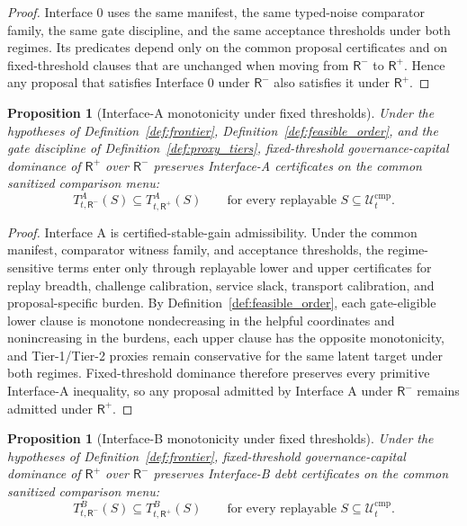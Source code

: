 \documentclass[11pt]{article}
\newtheorem{proposition}[theorem]{Proposition}
\theoremstyle{definition}
\newcommand{\1}{\mathbf{1}}
\begin{document}
\begin{proof}
Interface 0 uses the same manifest, the same typed-noise comparator family, the same gate discipline, and the same acceptance thresholds under both regimes. Its predicates depend only on the common proposal certificates and on fixed-threshold clauses that are unchanged when moving from $\mathsf R^-$ to $\mathsf R^+$. Hence any proposal that satisfies Interface 0 under $\mathsf R^-$ also satisfies it under $\mathsf R^+$.
\end{proof}

\begin{proposition}[Interface-A monotonicity under fixed thresholds]\label{prop:mono_gain}
Under the hypotheses of Definition~\ref{def:frontier}, Definition~\ref{def:feasible_order}, and the gate discipline of Definition~\ref{def:proxy_tiers}, fixed-threshold governance-capital dominance of $\mathsf R^+$ over $\mathsf R^-$ preserves Interface-A certificates on the common sanitized comparison menu:
\[
T^{A}_{t,\mathsf R^-}(S)\subseteq T^{A}_{t,\mathsf R^+}(S)
\qquad\text{for every replayable }S\subseteq\mathcal U_t^{\mathrm{cmp}}.
\]
\end{proposition}

\begin{proof}
Interface A is certified-stable-gain admissibility. Under the common manifest, comparator witness family, and acceptance thresholds, the regime-sensitive terms enter only through replayable lower and upper certificates for replay breadth, challenge calibration, service slack, transport calibration, and proposal-specific burden. By Definition~\ref{def:feasible_order}, each gate-eligible lower clause is monotone nondecreasing in the helpful coordinates and nonincreasing in the burdens, each upper clause has the opposite monotonicity, and Tier-1/Tier-2 proxies remain conservative for the same latent target under both regimes. Fixed-threshold dominance therefore preserves every primitive Interface-A inequality, so any proposal admitted by Interface A under $\mathsf R^-$ remains admitted under $\mathsf R^+$.
\end{proof}

\begin{proposition}[Interface-B monotonicity under fixed thresholds]\label{prop:mono_debt}
Under the hypotheses of Definition~\ref{def:frontier}, fixed-threshold governance-capital dominance of $\mathsf R^+$ over $\mathsf R^-$ preserves Interface-B debt certificates on the common sanitized comparison menu:
\[
T^{B}_{t,\mathsf R^-}(S)\subseteq T^{B}_{t,\mathsf R^+}(S)
\qquad\text{for every replayable }S\subseteq\mathcal U_t^{\mathrm{cmp}}.
\]
\end{proposition}
\end{document}
